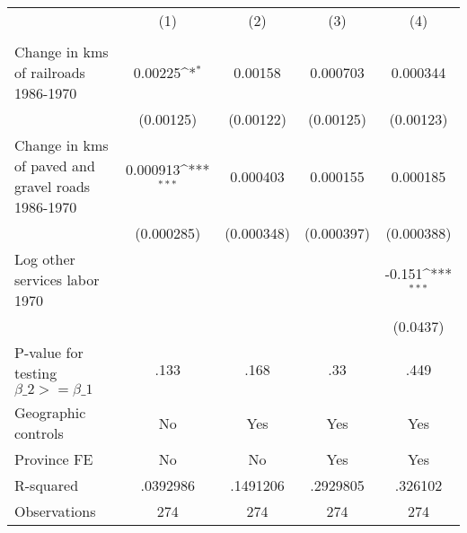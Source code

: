 {
\def\sym#1{\ifmmode^{#1}\else\(^{#1}\)\fi}
\begin{tabular}{l*{4}{c}}
\hline\hline
                &\multicolumn{1}{c}{(1)}&\multicolumn{1}{c}{(2)}&\multicolumn{1}{c}{(3)}&\multicolumn{1}{c}{(4)}\\
                &\multicolumn{1}{c}{}&\multicolumn{1}{c}{}&\multicolumn{1}{c}{}&\multicolumn{1}{c}{}\\
\hline
Change in kms of railroads 1986-1970&  0.00225\sym{*}  &  0.00158         & 0.000703         & 0.000344         \\
                &(0.00125)         &(0.00122)         &(0.00125)         &(0.00123)         \\
[1em]
Change in kms of paved and gravel roads 1986-1970& 0.000913\sym{***}& 0.000403         & 0.000155         & 0.000185         \\
                &(0.000285)         &(0.000348)         &(0.000397)         &(0.000388)         \\
[1em]
Log other services labor 1970&                  &                  &                  &   -0.151\sym{***}\\
                &                  &                  &                  & (0.0437)         \\
\hline
P-value for testing $\beta\_{2} >= \beta\_{1}$&     .133         &     .168         &      .33         &     .449         \\
Geographic controls&       No         &      Yes         &      Yes         &      Yes         \\
Province FE     &       No         &       No         &      Yes         &      Yes         \\
R-squared       & .0392986         & .1491206         & .2929805         &  .326102         \\
Observations    &      274         &      274         &      274         &      274         \\
\hline\hline
\end{tabular}
}
